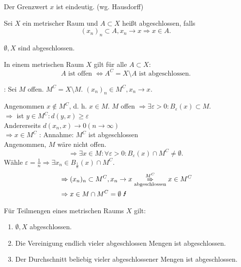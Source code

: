\documentclass[../ana2.tex]{subfiles}
\begin{document}
\begin{bem}
    Der Grenzwert \( x \) ist eindeutig. (wg. Hausdorff)
\end{bem}
\begin{defi}
    Sei \( X \) ein metrischer Raum und \( A \subset X \) 
    heißt abgeschlossen, falls 
    \[ (x_n)_n \subset A, x_n \rightarrow x 
    \Rightarrow x \in A. \]
\end{defi}
\begin{bem}
    \(\emptyset, X \) sind abgeschlossen.
\end{bem}
\begin{satz}
    In einem metrischen Raum 
    \( X \) gilt für alle \( A \subset X \):
    \[ A \text{ ist offen } 
    \Leftrightarrow A^C = X \setminus A \text{ ist 
    abgeschlossen}. \]
\end{satz}
\begin{bew}
    \gqq{\( \Rightarrow \)}: Sei \(M\) offen.
    \( M^C = X \setminus M \). \( (x_n)_n 
    \in M^C, x_n \rightarrow x \).

    Angenommen \( x \notin M^C\), d. h. \(x \in M \).
    \(M\) offen \(\Rightarrow \exists \varepsilon > 0:
    B_\varepsilon(x) \subset M. \) \\
    \( \Rightarrow \) ist \(y \in M^C: d(y, x) 
    \geq \varepsilon \) \\
    Andererseits \( d(x_n, x) \rightarrow 0 
    (n \rightarrow \infty)  \) \Lightning{} \\
    \( \Rightarrow x \in M^C \)
    \gqq{\( \Leftarrow \)}:
    Annahme: \( M^C \) ist abgeschlossen\\
    Angenommen, \(M\) wäre nicht offen.
    \[ \Rightarrow \exists x\in M: 
    \forall \varepsilon > 0 : B_\varepsilon(x) \cap 
    M^C \neq \emptyset. \]    
    Wähle \( \varepsilon = \frac{1}{n} 
    \Rightarrow \exists x_n \in B_{\frac{1}{n}}(x) \cap 
    M^C \).
    \begin{align*}
        &\Rightarrow (x_n)_n \subset M^C, x_n \rightarrow x 
        \overunderset{M^C}{\text{abgeschlossen}}{\Rightarrow} 
        x \in M^C \\
        &\Rightarrow x \in M \cap M^C = \emptyset \text{ \Lightning} 
    \end{align*}
\end{bew}
\begin{kor}
    Für Teilmengen eines metrischen Raums \(X\) gilt: 
    \begin{enumerate}
        \item \( \emptyset, X \) abgeschlossen.
        \item Die Vereinigung endlich vieler abgeschlossen 
        Mengen ist abgeschlossen.
        \item Der Durchschnitt beliebig vieler abgeschlossener 
        Mengen ist abgeschlossen.
    \end{enumerate}
\end{kor}
\end{document}
